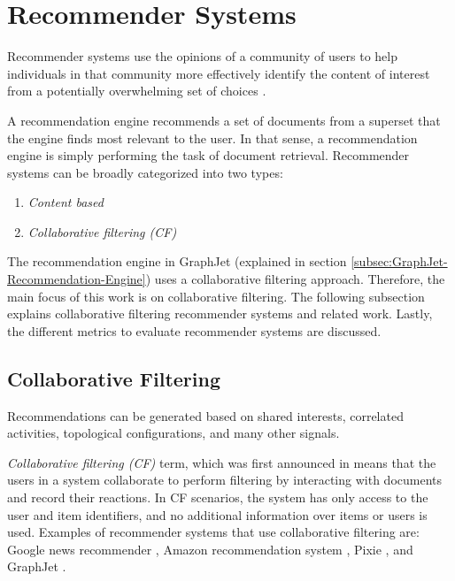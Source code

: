 \section{Recommender Systems}
\label{sec:recommender-systems}

Recommender systems use the opinions of a community of users to help individuals in that community more effectively identify the content of interest from a potentially overwhelming set of choices \cite{resnick1997recommender}.

A recommendation engine recommends a set of documents from a superset that the engine finds most relevant to the user. In that sense, a recommendation engine is simply performing the task of document retrieval. Recommender systems can be broadly categorized into two types:
\begin{enumerate}
    \item \emph{Content based}
    \item \emph{Collaborative filtering (CF)}
\end{enumerate}
The recommendation engine in GraphJet \cite{sharma2016graphjet} (explained in section \ref{subsec:GraphJet-Recommendation-Engine}) uses a collaborative filtering approach. Therefore, the main focus of this work is on collaborative filtering. The following subsection explains collaborative filtering recommender systems and related work. Lastly, the different metrics to evaluate recommender systems are discussed.

\subsection{Collaborative Filtering}
\label{subsec:collaborative-filtering}

Recommendations can be generated based on shared interests, correlated activities, topological configurations, and many other signals.

\emph{Collaborative filtering (CF)} term, which was first announced in \cite{goldberg1992using} means that the users in a system collaborate to perform filtering by interacting with documents and record their reactions.
In CF scenarios, the system has only access to the user and item identifiers, and no additional information over items or users is used.
Examples of recommender systems that use collaborative filtering are: Google news recommender \cite{das2007google}, Amazon recommendation system \cite{linden2003amazon}, Pixie \cite{eksombatchai2018pixie}, and GraphJet \cite{sharma2016graphjet}.


